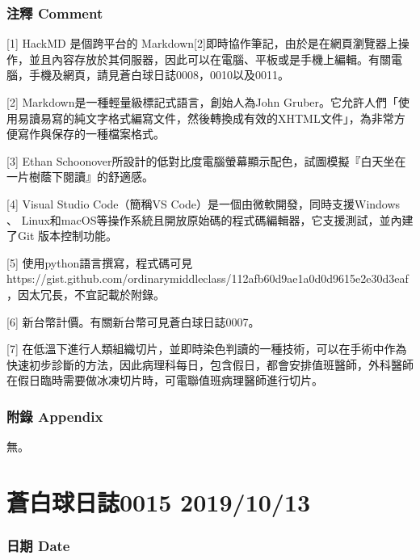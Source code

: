 \documentclass[a5paper, 12pt
]{book}
\begin{document}
\hypertarget{ux6ce8ux91cb-comment-7}{%
\subsubsection{注釋 Comment}\label{ux6ce8ux91cb-comment-7}}

{[}1{]} HackMD 是個跨平台的
Markdown{[}2{]}即時協作筆記，由於是在網頁瀏覽器上操作，並且內容存放於其伺服器，因此可以在電腦、平板或是手機上編輯。有關電腦，手機及網頁，請見蒼白球日誌0008，0010以及0011。

{[}2{]} Markdown是一種輕量級標記式語言，創始人為John
Gruber。它允許人們「使用易讀易寫的純文字格式編寫文件，然後轉換成有效的XHTML文件」，為非常方便寫作與保存的一種檔案格式。

{[}3{]} Ethan
Schoonover所設計的低對比度電腦螢幕顯示配色，試圖模擬『白天坐在一片樹蔭下閱讀』的舒適感。

{[}4{]} Visual Studio Code（簡稱VS
Code）是一個由微軟開發，同時支援Windows 、
Linux和macOS等操作系統且開放原始碼的程式碼編輯器，它支援測試，並內建了Git
版本控制功能。

{[}5{]} 使用python語言撰寫，程式碼可見
https://gist.github.com/ordinarymiddleclass/112afb60d9ae1a0d0d9615e2e30d3eaf
，因太冗長，不宜記載於附錄。

{[}6{]} 新台幣計價。有關新台幣可見蒼白球日誌0007。

{[}7{]}
在低溫下進行人類組織切片，並即時染色判讀的一種技術，可以在手術中作為快速初步診斷的方法，因此病理科每日，包含假日，都會安排值班醫師，外科醫師在假日臨時需要做冰凍切片時，可電聯值班病理醫師進行切片。

\hypertarget{ux9644ux9304-appendix-6}{%
\subsubsection{附錄 Appendix}\label{ux9644ux9304-appendix-6}}

無。

\hypertarget{ux84bcux767dux7403ux65e5ux8a8c0015-20191013}{%
\section{蒼白球日誌0015
2019/10/13}\label{ux84bcux767dux7403ux65e5ux8a8c0015-20191013}}

\hypertarget{ux65e5ux671f-date-14}{%
\subsubsection{日期 Date}\label{ux65e5ux671f-date-14}}
\end{document}
